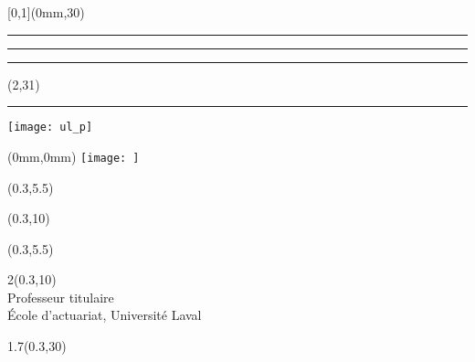 
\begingroup
{}
\textblockorigin{0mm}{0mm}
\setlength{\parindent}{0mm}
\setlength{\imageheight}{29\TPVertModule}
\setlength{\banderougewidth}{2\TPHorizModule}
\setlength{\banderougeheight}{\TPVertModule}
\setlength{\bandeorwidth}{\TPHorizModule}
\setlength{\bandeorheight}{\banderougeheight}
\setlength{\logoheight}{2.5\TPVertModule}
\setlength{\gapwidth}{1.5pt}
\addtolength{\bandeorwidth}{-\gapwidth}
\addtolength{\imageheight}{-\gapwidth}

\begin{textblock*}{\paperwidth}[0,1](0mm,30\TPVertModule)
  \textcolor{rouge}{\rule{\banderougewidth}{\banderougeheight}}%
  \rule{\gapwidth}{0pt}%
  \textcolor{or}{\rule{\bandeorwidth}{\bandeorheight}}           %
\end{textblock*}

\begin{textblock*}{\TPHorizModule}(2\TPHorizModule,31\TPVertModule)
  \rule{\gapwidth}{0pt}%
  \texttt{[image: ul\_p]}
\end{textblock*}

\begin{textblock*}{\paperwidth}(0mm,0mm)
  \texttt{[image: ]}
\end{textblock*}

\begin{textblock*}{\paperwidth}(0.3\TPHorizModule,5.5\TPVertModule)
  \color{white} \thetitle
\end{textblock*}

\begin{textblock*}{\paperwidth}(0.3\TPHorizModule,10\TPVertModule)
  \color{white} \theauthor
\end{textblock*}

\null\cleardoublepage


\begin{textblock*}{\paperwidth}(0.3\TPHorizModule,5.5\TPVertModule)
  \thetitle
\end{textblock*}

\begin{textblock*}{2\TPHorizModule}(0.3\TPHorizModule,10\TPVertModule)
  \theauthor \\
  \mdseries
  Professeur titulaire \\
  École d'actuariat, Université Laval
\end{textblock*}

\begin{textblock*}{1.7\TPHorizModule}(0.3\TPHorizModule,30\TPVertModule)
  \thedate
\end{textblock*}
\endgroup

